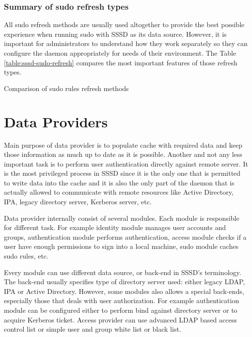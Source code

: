 \subsubsection{Summary of sudo refresh types}
\label{sssd:cache:sudo:summary}

All sudo refresh methods are usually used altogether to provide the best
possible experience when running sudo with SSSD as its data source. However, it
is important for administrators to understand how they work separately so they
can configure the daemon appropriately for needs of their environment. The Table
\ref{table:sssd-sudo-refresh} compares the most important features of those
refresh types.

\begin{table}[H]
  \centering
  
  \caption{Comparison of sudo rules refresh methods}
  \label{table:sssd-sudo-refresh}
\end{table}

\section{Data Providers}
\label{sssd:providers}

Main purpose of data provider is to populate cache with required data and keep
those information as much up to date as it is possible. Another and not any less
important task is to perform user authentication directly against remote server.
It is the most privileged process in SSSD since it is the only one that is
permitted to write data into the cache and it is also the only part of the
daemon that is actually allowed to communicate with remote resources like Active
Directory, IPA, legacy directory server, Kerberos server, etc.

Data provider internally consist of several modules. Each module is responsible
for different task. For example identity module manages user accounts and
groups, authentication module performs authentication, access module checks if a
user have enough permissions to sign into a local machine, sudo module caches
sudo rules, etc.

Every module can use different data source, or back-end in SSSD's terminology.
The back-end usually specifies type of directory server used: either legacy
LDAP, IPA or Active Directory. However, some modules also allows a special
back-ends, especially those that deals with user authorization. For example
authentication module can be configured either to perform bind against directory
server or to acquire Kerberos ticket. Access provider can use advanced LDAP
based access control list or simple user and group white list or black list.

